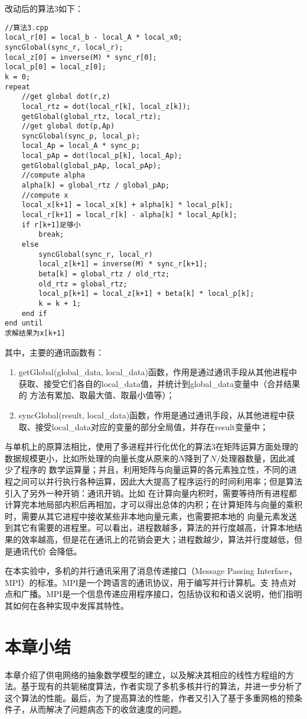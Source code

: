 改动后的算法3如下：
\begin{lstlisting}
//算法3.cpp
local_r[0] = local_b - local_A * local_x0;
syncGlobal(sync_r, local_r);
local_z[0] = inverse(M) * sync_r[0];
local_p[0] = local_z[0];
k = 0;
repeat
    //get global dot(r,z)
    local_rtz = dot(local_r[k], local_z[k]);
    getGlobal(global_rtz, local_rtz);
    //get global dot(p,Ap)
    syncGlobal(sync_p, local_p);
    local_Ap = local_A * sync_p;
    local_pAp = dot(local_p[k], local_Ap);
    getGlobal(global_pAp, local_pAp);
    //compute alpha
    alpha[k] = global_rtz / global_pAp;
    //compute x
    local_x[k+1] = local_x[k] + alpha[k] * local_p[k];
    local_r[k+1] = local_r[k] - alpha[k] * local_Ap[k];
    if r[k+1]足够小
        break;
    else
        syncGlobal(sync_r, local_r)
        local_z[k+1] = inverse(M) * sync_r[k+1];
        beta[k] = global_rtz / old_rtz;
        old_rtz = global_rtz;
        local_p[k+1] = local_z[k+1] + beta[k] * local_p[k];
        k = k + 1;
    end if
end until
求解结果为x[k+1]
\end{lstlisting}
其中，主要的通讯函数有：
\begin{enumerate}
    \item getGlobal(global\_data, local\_data)函数，作用是通过通讯手段从其他进程中获取、接受它们各自的local\_data值，并统计到global\_data变量中（合并结果的
    方法有累加、取最大值、取最小值等）；
    \item syncGlobal(result, local\_data)函数，作用是通过通讯手段，从其他进程中获取、接受local\_data对应的变量的部分全局值，并存在result变量中；
\end{enumerate}

与单机上的原算法相比，使用了多进程并行化优化的算法3在矩阵运算方面处理的数据规模更小，比如所处理的向量长度从原来的$N$降到了$N/\text{处理器数量}$，因此减少了程序的
数学运算量；并且，利用矩阵与向量运算的各元素独立性，不同的进程之间可以并行执行各种运算，因此大大提高了程序运行的时间利用率；但是算法引入了另外一种开销：通讯开销。比如
在计算向量内积时，需要等待所有进程都计算完本地局部内积后再相加，才可以得出总体的内积；在计算矩阵与向量的乘积时，需要从其它进程中接收某些非本地向量元素，也需要把本地的
向量元素发送到其它有需要的进程里。可以看出，进程数越多，算法的并行度越高，计算本地结果的效率越高，但是花在通讯上的花销会更大；进程数越少，算法并行度越低，但是通讯代价
会降低。

在本实验中，多机的并行通讯采用了消息传递接口（Message Passing Interface，MPI）的标准。MPI是一个跨语言的通讯协议，用于编写并行计算机。支
持点对点和广播。MPI是一个信息传递应用程序接口，包括协议和和语义说明，他们指明其如何在各种实现中发挥其特性。

\section{本章小结}

本章介绍了供电网络的抽象数学模型的建立，以及解决其相应的线性方程组的方法。基于现有的共轭梯度算法，作者实现了多机多核并行的算法，并进一步分析了这个算法的性能。最后，为了提高算法的性能，作者又引入了基于多重网格的预条件子，从而解决了问题病态下的收敛速度的问题。
